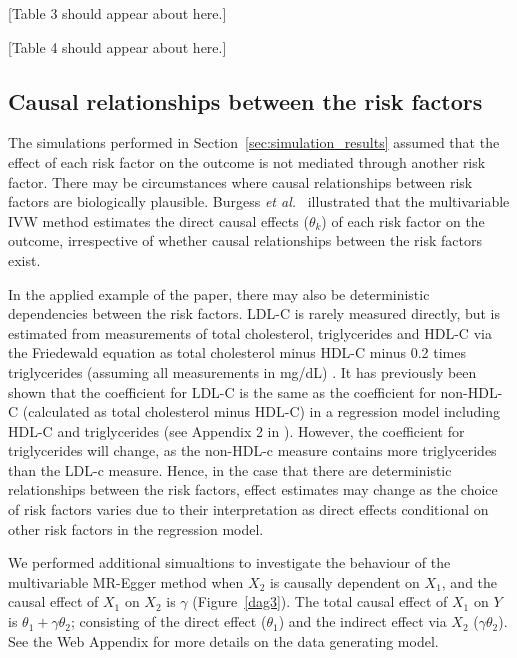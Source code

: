 \documentclass[a4paper,12pt]{article}
\begin{document}
\begin{bibunit}[wileyj]
\begin{center}
[Table 3 should appear about here.]
\end{center}

\begin{center}
[Table 4 should appear about here.]
\end{center}

\subsection{Causal relationships between the risk factors} 
The simulations performed in Section~\ref{sec:simulation_results} assumed that the effect of each risk factor on the outcome is not mediated through another risk factor. There may be circumstances where causal relationships between risk factors are biologically plausible. Burgess \textit{et al.}\ \cite{burgess2015multivariable} illustrated that the multivariable IVW method estimates the direct causal effects ($\theta_k$) of each risk factor on the outcome, irrespective of whether causal relationships between the risk factors exist. 

In the applied example of the paper, there may also be deterministic dependencies between the risk factors. LDL-C is rarely measured directly, but is estimated from measurements of total cholesterol, triglycerides and HDL-C via the Friedewald equation as total cholesterol minus HDL-C minus 0.2 times triglycerides (assuming all measurements in mg/dL) \cite{Friedewald1972}. It has previously been shown that the coefficient for LDL-C is the same as the coefficient for non-HDL-C (calculated as total cholesterol minus HDL-C) in a regression model including HDL-C and triglycerides (see Appendix 2 in \cite{Angelantonio2009}). However, the coefficient for triglycerides will change, as the non-HDL-c measure contains more triglycerides than the LDL-c measure. Hence, in the case that there are deterministic relationships between the risk factors, effect estimates may change as the choice of risk factors varies due to their interpretation as direct effects conditional on other risk factors in the regression model.

We performed additional simualtions to investigate the behaviour of the multivariable MR-Egger method when $X_2$ is causally dependent on $X_1$, and the causal effect of $X_1$ on $X_2$ is $\gamma$ (Figure~\ref{dag3}). The total causal effect of $X_1$ on $Y$ is $\theta_1 + \gamma\theta_2$; consisting of the direct effect ($\theta_1$) and the indirect effect via $X_2$ ($\gamma\theta_2$). See the Web Appendix for more details on the data generating model.  


\end{bibunit}
\end{document}
